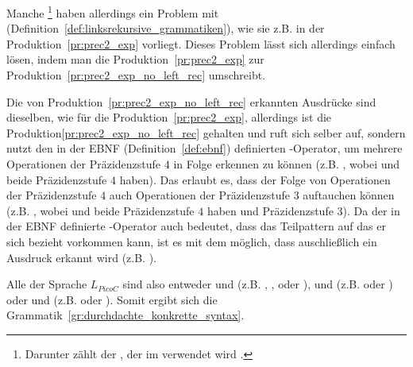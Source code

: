 \begin{grammar}
\end{grammar}

\begin{Special_Paragraph}
  Manche \footnote{Darunter zählt der , der im  verwendet wird .} haben allerdings ein Problem mit  (Definition~\ref{def:linksrekursive_grammatiken}), wie sie z.B. in der Produktion~\ref{pr:prec2_exp} vorliegt. Dieses Problem lässt sich allerdings einfach lösen, indem man die Produktion~\ref{pr:prec2_exp} zur Produktion~\ref{pr:prec2_exp_no_left_rec} umschreibt.

\begin{grammar}
\end{grammar}

Die von Produktion~\ref{pr:prec2_exp_no_left_rec} erkannten Ausdrücke sind dieselben, wie für die Produktion~\ref{pr:prec2_exp}, allerdings ist die Produktion\ref{pr:prec2_exp_no_left_rec}  gehalten und ruft sich  selber auf, sondern nutzt den in der EBNF (Definition~\ref{def:ebnf}) definierten \smalltt{*}-Operator, um mehrere Operationen der Präzidenzstufe $4$ in Folge erkennen zu können (z.B. , wobei \smalltt{-} und \smalltt{+} beide Präzidenzstufe $4$ haben). Das   erlaubt es, dass  der Folge von Operationen der Präzidenzstufe $4$ auch Operationen der Präzidenzstufe $3$ auftauchen können (z.B. , wobei \smalltt{-} und \smalltt{+} beide Präzidenzstufe $4$ haben und \smalltt{/} Präzidenzstufe $3$). Da der in der EBNF definierte \smalltt{*}-Operator auch bedeutet, dass das Teilpattern auf das er sich bezieht  vorkommen kann, ist es mit dem   möglich, dass auschließlich ein Ausdruck  erkannt wird (z.B. ).
\end{Special_Paragraph}

Alle  der Sprache $L_{PicoC}$ sind also entweder  und  (z.B. , ,  oder ),  und  (z.B.  oder ) oder  und  (z.B.  oder ). Somit ergibt sich die Grammatik~\ref{gr:durchdachte_konkrette_syntax}.

